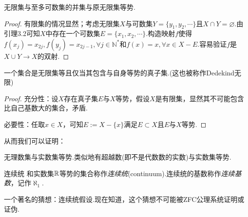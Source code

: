 \begin{theorem}
	无限集与至多可数集的并集与原无限集等势.
\end{theorem}
\begin{proof}
	有限集的情况显然；考虑无限集$X$与可数集$Y=\{ y_1,y_2,\cdots \}$且$X \cap Y = \varnothing$.由引理3.2可知$X$中存在一个可数集$E=\{ x_1,x_2,\cdots \}$.构造映射$f$使得$f(x_j)=x_{2j},f(y_j)=x_{2j-1}, \forall j \in \mathbb{N}^*$和$f(x)=x,\forall x \in X-E$.容易验证$f$是$X \cup Y \to X$的双射.
\end{proof}

\begin{theorem}
	一个集合是无限集等且仅当其包含与自身等势的真子集.(这也被称作Dedekind无限)
\end{theorem}
\begin{proof}
	充分性：设$X$存在真子集$E$与$X$等势，假设$X$是有限集，显然其不可能包含比自己基数大的集合，矛盾.
	
	必要性：任取$x \in X$，可知$E:=X-\{x\}$满足$E \subset X$且$E$与$X$等势.
\end{proof}

从而我们可以证明：

\begin{proposition}
	无理数集与实数集等势.类似地有超越数(即不是代数数的实数)与实数集等势.
\end{proposition}

\begin{definition}{连续统}
	和实数集$\mathbb{R}$等势的集合称作\textit{连续统}(continuum).连续统的基数称作\textit{连续基数}，记作$\aleph _1$.
\end{definition}

一个著名的猜想：连续统假设.现在知道，这个猜想不可能被ZFC公理系统证明或证伪.
